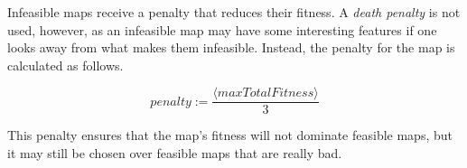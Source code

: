 Infeasible maps receive a penalty that reduces their fitness. A \textit{death penalty}\cite{coello2012constraint} is not used, however, as an infeasible map may have some interesting features if one looks away from what makes them infeasible. Instead, the penalty for the map is calculated as follows.

\begin{equation}
	penalty := \frac{\langle maxTotalFitness\rangle}{3}
\end{equation}

This penalty ensures that the map's fitness will not dominate feasible maps, but it may still be chosen over feasible maps that are really bad.